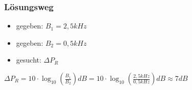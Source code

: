 \begin{frame}
\frametitle{Lösungsweg}
\begin{itemize}
  \item gegeben: $B_1 = 2,5kHz$
  \item gegeben: $B_2 = 0,5kHz$
  \item gesucht: $\Delta P_R$
  \end{itemize}
    \pause
    $\Delta P_R = 10 \cdot \log_{10}{(\frac{B_1}{B_2})}dB = 10 \cdot \log_{10}{(\frac{2,5kHz}{0,5kHz})}dB \approx 7dB$



\end{frame}%
